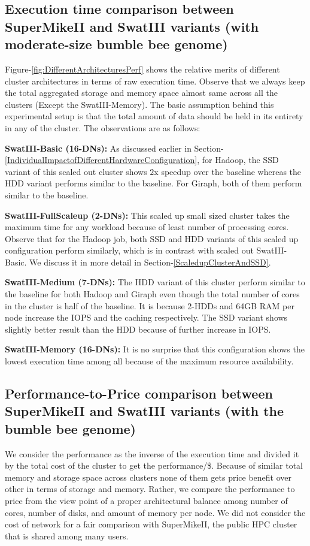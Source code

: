 \documentclass[10pt, conference, compsocconf]{IEEEtran}
\begin{document}
\subsection {Execution time comparison between SuperMikeII and SwatIII variants (with moderate-size bumble bee genome)} \label{ExecutionTimeDiffArchBumblebee}
Figure-\ref{fig:DifferentArchitecturesPerf} shows the relative merits of different cluster architectures in terms of raw execution time. Observe that we always keep the total aggregated storage and memory space almost same across all the clusters (Except the SwatIII-Memory). The basic assumption behind this experimental setup is that the total amount of data should be held in its entirety in any of the cluster. The observations are as follows:
\begin{inparaenum}[\itshape 1\upshape)]
\item \textbf{SwatIII-Basic (16-DNs):} As discussed earlier in Section-\ref{IndividualImpactofDifferentHardwareConfiguration}, for Hadoop, the SSD variant of this scaled out cluster shows $2$x speedup over the baseline whereas the HDD variant performs similar to the baseline. For Giraph, both of them perform similar to the baseline.
\item \textbf{SwatIII-FullScaleup (2-DNs):} This scaled up small sized cluster takes the maximum time for any workload because of least number of processing cores. Observe that for the Hadoop job, both SSD and HDD variants of this scaled up configuration perform similarly, which is in contrast with scaled out SwatIII-Basic. We discuss it in more detail in Section-\ref{ScaledupClusterAndSSD}.
\item \textbf{SwatIII-Medium (7-DNs):} The HDD variant of this cluster perform similar to the baseline for both Hadoop and Giraph even though the total number of cores in the cluster is half of the baseline. It is because 2-HDDs and 64GB RAM per node increase the IOPS and the caching respectively. The SSD variant shows slightly better result than the HDD because of further increase in IOPS.
\item \textbf{SwatIII-Memory (16-DNs):} It is no surprise that this configuration shows the lowest execution time among all because of the maximum resource availability.
\end{inparaenum}

\subsection {Performance-to-Price comparison between SuperMikeII and SwatIII variants (with the bumble bee genome)} \label{PriceToPerformanceBumbleBee}
We consider the performance as the inverse of the execution time and divided it by the total cost of the cluster to get the performance/\$. Because of similar total memory and storage space across clusters none of them gets price benefit over other in terms of storage and memory. Rather, we compare the performance to price from the view point of a proper architectural balance among number of cores, number of disks, and amount of memory per node. We did not consider the cost of network for a fair comparison with SuperMikeII, the public HPC cluster that is shared among many users.
\end{document}
